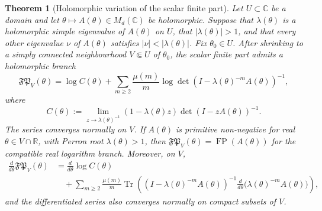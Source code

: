 \documentclass[11pt,a4paper]{amsart}
\theoremstyle{plain}
\newtheorem{theorem}{Theorem}[section]
\theoremstyle{definition}
\theoremstyle{remark}
\DeclareMathOperator{\Tr}{Tr}
\DeclareMathOperator{\FP}{FP}
\newcommand{\CC}{\mathbb{C}}
\newcommand{\RR}{\mathbb{R}}
\begin{document}
\begin{theorem}[Holomorphic variation of the scalar finite part]
  \label{thm:finite-part-holomorphic-variation}
  Let \(U\subset\CC\) be a domain and let
  \(\theta\mapsto A(\theta)\in M_d(\CC)\) be holomorphic. Suppose that
  \(\lambda(\theta)\) is a holomorphic simple eigenvalue of
  \(A(\theta)\) on \(U\), that \(|\lambda(\theta)|>1\), and that every
  other eigenvalue \(\nu\) of \(A(\theta)\) satisfies
  \(|\nu|<|\lambda(\theta)|\). Fix \(\theta_0\in U\). After shrinking to
  a simply connected neighbourhood \(V\Subset U\) of \(\theta_0\), the
  scalar finite part admits a holomorphic branch
  \[
    \mathfrak{FP}_{V}(\theta)
    =
    \log C(\theta)
    +\sum_{m\ge 2}\frac{\mu(m)}{m}
      \log\det(I-\lambda(\theta)^{-m}A(\theta))^{-1},
  \]
  where
  \[
    C(\theta):=
    \lim_{z\to\lambda(\theta)^{-1}}
      (1-\lambda(\theta)z)\det(I-zA(\theta))^{-1}.
  \]
  The series converges normally on \(V\). If \(A(\theta)\) is
  primitive non-negative for real \(\theta\in V\cap\RR\), with Perron
  root \(\lambda(\theta)>1\), then
  \(\mathfrak{FP}_{V}(\theta)=\FP(A(\theta))\) for the compatible real
  logarithm branch. Moreover, on \(V\),
  \[
  \begin{aligned}
    \frac{d}{d\theta}\mathfrak{FP}_{V}(\theta)
    &=
    \frac{d}{d\theta}\log C(\theta)  \\
    &\quad+
    \sum_{m\ge 2}\frac{\mu(m)}{m}
      \Tr\!\left(
        (I-\lambda(\theta)^{-m}A(\theta))^{-1}
        \frac{d}{d\theta}
          \bigl(\lambda(\theta)^{-m}A(\theta)\bigr)
      \right),
  \end{aligned}
  \]
  and the differentiated series also converges normally on compact
  subsets of \(V\).
\end{theorem}
\end{document}
